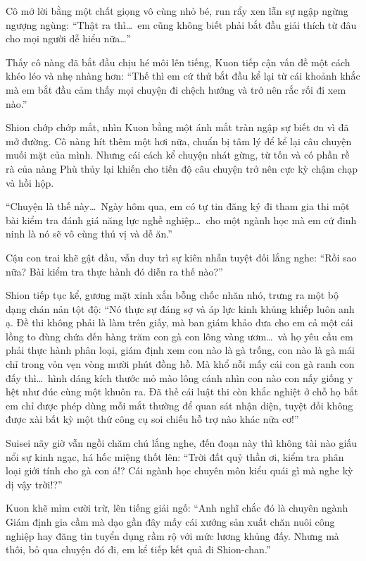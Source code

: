 \documentclass[../main.tex]{subfiles}
\begin{document}
Cô mở lời bằng một chất giọng vô cùng nhỏ bé, run rẩy xen lẫn sự ngập ngừng ngượng ngùng: ``Thật ra thì\dots\ em cũng không biết phải bắt đầu giải thích từ đâu cho mọi người dễ hiểu nữa\dots''

Thấy cô nàng đã bắt đầu chịu hé môi lên tiếng, Kuon tiếp cận vấn đề một cách khéo léo và nhẹ nhàng hơn: ``Thế thì em cứ thử bắt đầu kể lại từ cái khoảnh khắc mà em bắt đầu cảm thấy mọi chuyện đi chệch hướng và trở nên rắc rối đi xem nào.''

Shion chớp chớp mắt, nhìn Kuon bằng một ánh mắt tràn ngập sự biết ơn vì đã mở đường. Cô nàng hít thêm một hơi nữa, chuẩn bị tâm lý để kể lại câu chuyện muối mặt của mình. Nhưng cái cách kể chuyện nhát gừng, từ tốn và có phần rề rà của nàng Phù thủy lại khiến cho tiến độ câu chuyện trở nên cực kỳ chậm chạp và hồi hộp.

``Chuyện là thế này\dots\ Ngày hôm qua, em có tự tin đăng ký đi tham gia thi một bài kiểm tra đánh giá năng lực nghề nghiệp\dots\ cho một ngành học mà em cứ đinh ninh là nó sẽ vô cùng thú vị và dễ ăn.''

Cậu con trai khẽ gật đầu, vẫn duy trì sự kiên nhẫn tuyệt đối lắng nghe: ``Rồi sao nữa? Bài kiểm tra thực hành đó diễn ra thế nào?''

Shion tiếp tục kể, gương mặt xinh xắn bỗng chốc nhăn nhó, trưng ra một bộ dạng chán nản tột độ: ``Nó thực sự đáng sợ và áp lực kinh khủng khiếp luôn anh ạ. Đề thi không phải là làm trên giấy, mà ban giám khảo đưa cho em cả một cái lồng to đùng chứa đến hàng trăm con gà con lông vàng ươm\dots\ và họ yêu cầu em phải thực hành phân loại, giám định xem con nào là gà trống, con nào là gà mái chỉ trong vỏn vẹn vòng mười phút đồng hồ. Mà khổ nỗi mấy cái con gà ranh con đấy thì\dots\ hình dáng kích thước mỏ mào lông cánh nhìn con nào con nấy giống y hệt như đúc cùng một khuôn ra. Đã thế cái luật thi còn khắc nghiệt ở chỗ họ bắt em chỉ được phép dùng mỗi mắt thường để quan sát nhận diện, tuyệt đối không được xài bất kỳ một thứ công cụ soi chiếu hỗ trợ nào khác nữa cơ!''

Suisei nãy giờ vẫn ngồi chăm chú lắng nghe, đến đoạn này thì không tài nào giấu nổi sự kinh ngạc, há hốc miệng thốt lên: ``Trời đất quỷ thần ơi, kiểm tra phân loại giới tính cho gà con á!? Cái ngành học chuyên môn kiểu quái gì mà nghe kỳ dị vậy trời!?''

Kuon khẽ mỉm cười trừ, lên tiếng giải ngố: ``Anh nghĩ chắc đó là chuyên ngành Giám định gia cầm mà dạo gần đây mấy cái xưởng sản xuất chăn nuôi công nghiệp hay đăng tin tuyển dụng rầm rộ với mức lương khủng đấy. Nhưng mà thôi, bỏ qua chuyện đó đi, em kể tiếp kết quả đi Shion-chan.''
\end{document}
